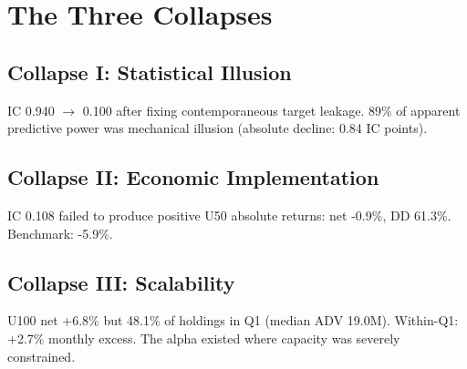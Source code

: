 \section{The Three Collapses}
\subsection{Collapse I: Statistical Illusion}
IC 0.940 $\to$ 0.100 after fixing contemporaneous target leakage. 89\% of apparent predictive power was mechanical illusion (absolute decline: 0.84 IC points).

\subsection{Collapse II: Economic Implementation}
IC 0.108 failed to produce positive U50 absolute returns: net -0.9\%, DD 61.3\%. Benchmark: -5.9\%.

\subsection{Collapse III: Scalability}
U100 net +6.8\% but 48.1\% of holdings in Q1 (median ADV 19.0M\textyen). Within-Q1: +2.7\% monthly excess. The alpha existed where capacity was severely constrained.
